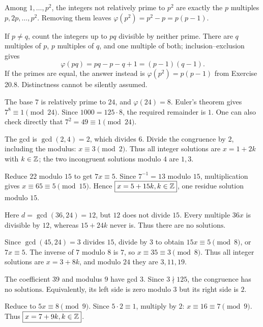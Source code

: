 Among $1,\ldots,p^2$, the integers not relatively prime to $p^2$ are exactly the $p$ multiples $p,2p,\ldots,p^2$. Removing them leaves $\boxed{\varphi(p^2)=p^2-p=p(p-1)}$.

If $p\ne q$, count the integers up to $pq$ divisible by neither prime. There are $q$ multiples of $p$, $p$ multiples of $q$, and one multiple of both; inclusion--exclusion gives
\[\boxed{\varphi(pq)=pq-p-q+1=(p-1)(q-1)}.
\]
If the primes are equal, the answer instead is $\varphi(p^2)=p(p-1)$ from Exercise 20.8. Distinctness cannot be silently assumed.

The base $7$ is relatively prime to $24$, and $\varphi(24)=8$. Euler's theorem gives $7^8\equiv1\pmod {24}$. Since $1000=125\cdot8$, the required remainder is $\boxed1$. One can also check directly that $7^2=49\equiv1\pmod {24}$.

The gcd is $\gcd(2,4)=2$, which divides $6$. Divide the congruence by $2$, including the modulus: $x\equiv3\pmod2$. Thus all integer solutions are $x=1+2k$ with $k\in\mathbb{Z}$; the two incongruent solutions modulo $4$ are $\boxed{1,3}$.

Reduce $22$ modulo $15$ to get $7x\equiv5$. Since $7^{-1}=13$ modulo $15$, multiplication gives $x\equiv65\equiv5\pmod {15}$. Hence $\boxed{x=5+15k, k\in\mathbb{Z}}$, one residue solution modulo $15$.

Here $d=\gcd(36,24)=12$, but $12$ does not divide $15$. Every multiple $36x$ is divisible by $12$, whereas $15+24k$ never is. Thus there are $\boxed{\text{no solutions}}$.

Since $\gcd(45,24)=3$ divides $15$, divide by $3$ to obtain $15x\equiv5\pmod8$, or $7x\equiv5$. The inverse of $7$ modulo $8$ is $7$, so $x\equiv35\equiv3\pmod8$. Thus all integer solutions are $x=3+8k$, and modulo $24$ they are $\boxed{3,11,19}$.

The coefficient $39$ and modulus $9$ have gcd $3$. Since $3\nmid125$, the congruence has $\boxed{\text{no solutions}}$. Equivalently, its left side is zero modulo $3$ but its right side is $2$.

Reduce to $5x\equiv8\pmod9$. Since $5\cdot2\equiv1$, multiply by $2$: $x\equiv16\equiv7\pmod9$. Thus $\boxed{x=7+9k, k\in\mathbb{Z}}$.

